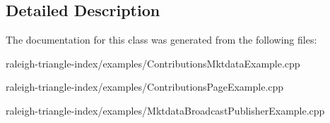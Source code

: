 \subsection{Detailed Description}


The documentation for this class was generated from the following files\+:\begin{DoxyCompactItemize}
\item 
raleigh-\/triangle-\/index/examples/Contributions\+Mktdata\+Example.\+cpp\item 
raleigh-\/triangle-\/index/examples/Contributions\+Page\+Example.\+cpp\item 
raleigh-\/triangle-\/index/examples/Mktdata\+Broadcast\+Publisher\+Example.\+cpp\end{DoxyCompactItemize}
